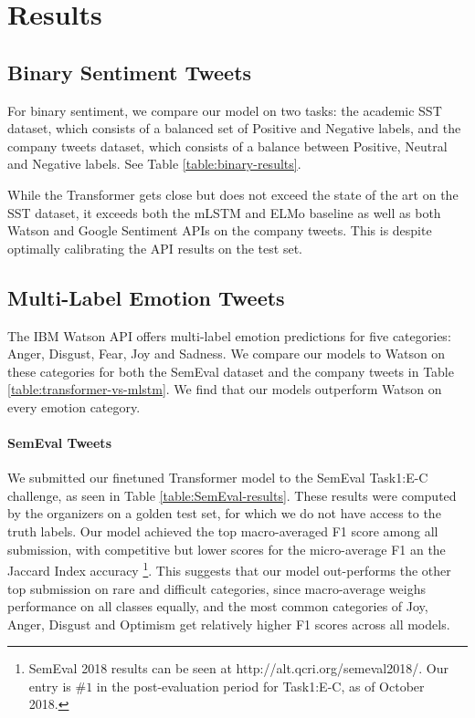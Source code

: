 \documentclass[letterpaper]{article} \usepackage{aaai19}  \usepackage{times}  \usepackage{helvet}  \usepackage{courier}  \usepackage{url}  \usepackage{graphicx}  \usepackage{booktabs}
\begin{document}
\section{Results}
\subsection{Binary Sentiment Tweets}
For binary sentiment, we compare our model on two tasks: the academic SST dataset, which consists of a balanced set of Positive and Negative labels, and the company tweets dataset, which consists of a balance between Positive, Neutral and Negative labels. See Table \ref{table:binary-results}.

While the Transformer gets close but does not exceed the state of the art on the SST dataset, it exceeds both the mLSTM and ELMo baseline as well as both Watson and Google Sentiment APIs on the company tweets. This is despite optimally calibrating the API results on the test set.


\subsection{Multi-Label Emotion Tweets}
The IBM Watson API offers multi-label emotion predictions for five categories: Anger, Disgust, Fear, Joy and Sadness. We compare our models to Watson on these categories for both the SemEval dataset and the company tweets in Table \ref{table:transformer-vs-mlstm}. We find that our models outperform Watson on every emotion category. 

\paragraph{SemEval Tweets}
We submitted our finetuned Transformer model to the SemEval Task1:E-C challenge, as seen in Table \ref{table:SemEval-results}. These results were computed by the organizers on a golden test set, for which we do not have access to the truth labels. Our model achieved the top macro-averaged F1 score among all submission, with competitive but lower scores for the micro-average F1 an the Jaccard Index accuracy \footnote{SemEval 2018 results can be seen at 
http://alt.qcri.org/semeval2018/. Our entry is $\#1$ in the post-evaluation period for Task1:E-C, as of October 2018.}. This suggests that our model out-performs the other top submission on rare and difficult categories, since macro-average weighs performance on all classes equally, and the most common categories of Joy, Anger, Disgust and Optimism get relatively higher F1 scores across all models. 
\end{document}
